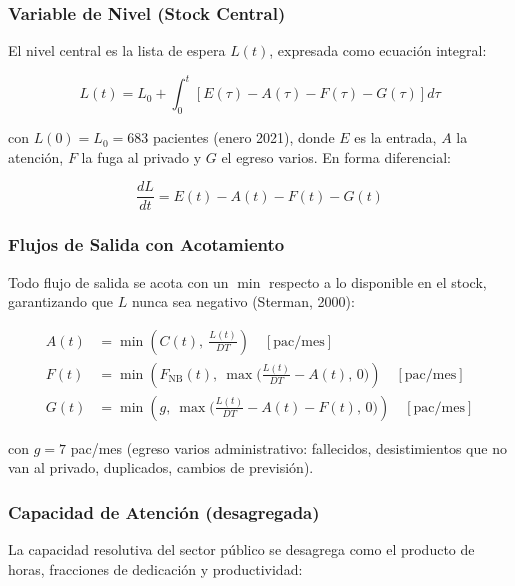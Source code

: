 \documentclass[12pt,a4paper]{article}
\begin{document}
\subsubsection*{Variable de Nivel (Stock Central)}

El nivel central es la lista de espera $L(t)$, expresada como ecuación integral:

\begin{equation}
\boxed{
L(t) = L_0 + \int_0^t \left[ E(\tau) - A(\tau) - F(\tau) - G(\tau) \right] d\tau
}
\label{eq:nivel}
\end{equation}

con $L(0) = L_0 = 683$ pacientes (enero 2021), donde $E$ es la entrada, $A$ la atención, $F$ la fuga al privado y $G$ el egreso varios. En forma diferencial:

\begin{equation}
\frac{dL}{dt} = E(t) - A(t) - F(t) - G(t)
\end{equation}

\subsubsection*{Flujos de Salida con Acotamiento}

Todo flujo de salida se acota con un $\min$ respecto a lo disponible en el stock, garantizando que $L$ nunca sea negativo (Sterman, 2000):

\begin{align}
A(t) &= \min\!\left( C(t),\ \tfrac{L(t)}{DT} \right) \quad [\text{pac/mes}] \label{eq:atencion}\\[4pt]
F(t) &= \min\!\left( F_{\text{NB}}(t),\ \max\!\bigl(\tfrac{L(t)}{DT} - A(t),\,0\bigr) \right) \quad [\text{pac/mes}] \label{eq:fuga}\\[4pt]
G(t) &= \min\!\left( g,\ \max\!\bigl(\tfrac{L(t)}{DT} - A(t) - F(t),\,0\bigr) \right) \quad [\text{pac/mes}] \label{eq:egreso}
\end{align}

con $g = 7$ pac/mes (egreso varios administrativo: fallecidos, desistimientos que no van al privado, duplicados, cambios de previsión). 

\subsubsection*{Capacidad de Atención (desagregada)}

La capacidad resolutiva del sector público se desagrega como el producto de horas, fracciones de dedicación y productividad:
\end{document}
